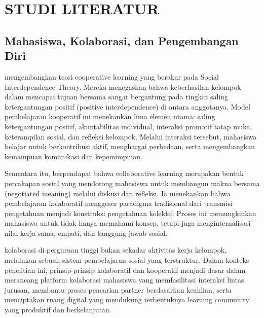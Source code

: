 \chapter{STUDI LITERATUR}
\label{chap:studi-literatur}

\section{Mahasiswa, Kolaborasi, dan Pengembangan Diri}
\Textcite{johnsonCooperativeLearningReturns1998} mengembangkan teori cooperative learning yang berakar pada Social Interdependence Theory. Mereka menegaskan bahwa keberhasilan kelompok dalam mencapai tujuan bersama sangat bergantung pada tingkat saling ketergantungan positif (positive interdependence) di antara anggotanya. Model pembelajaran kooperatif ini menekankan lima elemen utama: saling ketergantungan positif, akuntabilitas individual, interaksi promotif tatap muka, keterampilan sosial, dan refleksi kelompok. Melalui interaksi tersebut, mahasiswa belajar untuk berkontribusi aktif, menghargai perbedaan, serta mengembangkan kemampuan komunikasi dan kepemimpinan.

Sementara itu, \Textcite{panhwarDifferentiatingCooperativeLearning2017} berpendapat bahwa collaborative learning merupakan bentuk percakapan sosial yang mendorong mahasiswa untuk membangun makna bersama (negotiated meaning) melalui diskusi dan refleksi. Ia menekankan bahwa pembelajaran kolaboratif menggeser paradigma tradisional dari transmisi pengetahuan menjadi konstruksi pengetahuan kolektif. Proses ini memungkinkan mahasiswa untuk tidak hanya memahami konsep, tetapi juga menginternalisasi nilai kerja sama, empati, dan tanggung jawab sosial.

kolaborasi di perguruan tinggi bukan sekadar aktivitas kerja kelompok, melainkan sebuah sistem pembelajaran sosial yang terstruktur. Dalam konteks penelitian ini, prinsip-prinsip kolaboratif dan kooperatif menjadi dasar dalam merancang platform kolaborasi mahasiswa yang memfasilitasi interaksi lintas jurusan, membantu proses pencarian partner berdasarkan keahlian, serta menciptakan ruang digital yang mendukung terbentuknya learning community yang produktif dan berkelanjutan.

